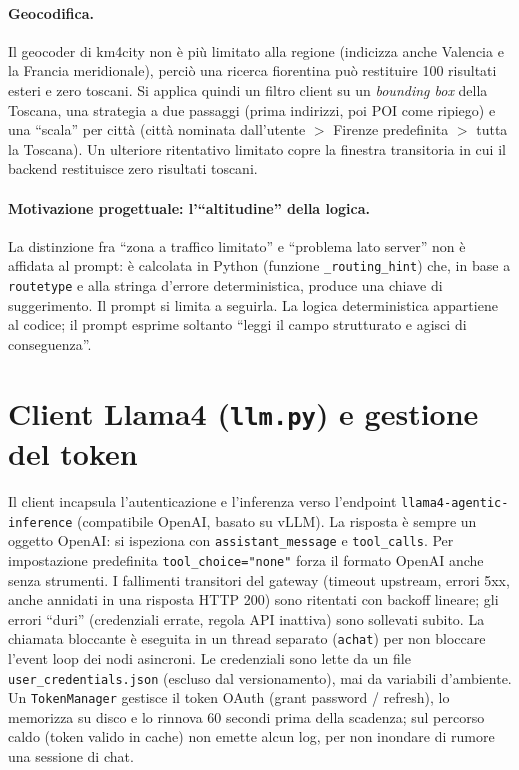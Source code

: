 \documentclass[11pt,a4paper]{article}
\begin{document}
\paragraph{Geocodifica.} Il geocoder di km4city non è più limitato alla regione
(indicizza anche Valencia e la Francia meridionale), perciò una ricerca
fiorentina può restituire 100 risultati esteri e zero toscani. Si applica quindi
un filtro client su un \emph{bounding box} della Toscana, una strategia a due
passaggi (prima indirizzi, poi POI come ripiego) e una ``scala'' per città
(città nominata dall'utente $>$ Firenze predefinita $>$ tutta la Toscana). Un
ulteriore ritentativo limitato copre la finestra transitoria in cui il backend
restituisce zero risultati toscani.

\paragraph{Motivazione progettuale: l'``altitudine'' della logica.} La
distinzione fra ``zona a traffico limitato'' e ``problema lato server'' non è
affidata al prompt: è calcolata in Python (funzione \texttt{\_routing\_hint})
che, in base a \texttt{routetype} e alla stringa d'errore deterministica,
produce una chiave di suggerimento. Il prompt si limita a seguirla. La logica
deterministica appartiene al codice; il prompt esprime soltanto ``leggi il campo
strutturato e agisci di conseguenza''.

\section{Client Llama4 (\texttt{llm.py}) e gestione del token}
Il client incapsula l'autenticazione e l'inferenza verso l'endpoint
\texttt{llama4-agentic-inference} (compatibile OpenAI, basato su vLLM). La
risposta è sempre un oggetto OpenAI: si ispeziona con \texttt{assistant\_message}
e \texttt{tool\_calls}. Per impostazione predefinita \texttt{tool\_choice="none"}
forza il formato OpenAI anche senza strumenti. I fallimenti transitori del
gateway (timeout upstream, errori 5xx, anche annidati in una risposta HTTP 200)
sono ritentati con backoff lineare; gli errori ``duri'' (credenziali errate,
regola API inattiva) sono sollevati subito. La chiamata bloccante è eseguita in
un thread separato (\texttt{achat}) per non bloccare l'event loop dei nodi
asincroni. Le credenziali sono lette da un file \texttt{user\_credentials.json}
(escluso dal versionamento), mai da variabili d'ambiente. Un \texttt{TokenManager}
gestisce il token OAuth (grant password / refresh), lo memorizza su disco e lo
rinnova 60 secondi prima della scadenza; sul percorso caldo (token valido in
cache) non emette alcun log, per non inondare di rumore una sessione di chat.
\end{document}
